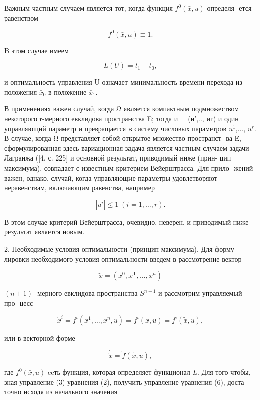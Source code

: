 \documentclass[10pt]{article}
\begin{document}
Важным частным случаем является тот, когда функция \({f}^{0}\left( {\bar{x},u}\right)\) определя- ется равенством

\[
{f}^{0}\left( {\bar{x},u}\right)  \equiv  1. \tag{4}
\]

B этом случае имеем

\[
L\left( U\right)  = {t}_{1} - {t}_{0},
\]

и оптимальность управления U означает минимальность времени перехода из положения \({\bar{x}}_{0}\) в положение \({\bar{x}}_{1}\).

В применениях важен случай, когда Ω является компактным подмножеством некоторого r-мерного евклидова пространства E; тогда и = (и',.., иг) и один управляющий параметр и превращается в систему числовых параметров \({u}^{1}\),..., \({u}^{r}\). В случае, когда Ω представляет собой открытое множество пространст- ва E, сформулированная здесь вариационная задача является частным случаем задачи Лагранжа ([4, с. 225] и основной результат, приводимый ниже (прин- цип максимума), совпадает с известным критерием Вейерштрасса. Для прило- жений важен, однако, случай, когда управляющие параметры удовлетворяют неравенствам, включающим равенства, например

\[
\left| {u}^{i}\right|  \leq  1\;\left( {i = 1,\ldots,r}\right).
\]

В этом случае критерий Вейерштрасса, очевидно, неверен, и приводимый ниже результат является новым.

2. Необходимые условия оптимальности (принцип максимума). Для форму- лировки необходимого условия оптимальности введем в рассмотрение вектор

\[
\widetilde{x} = \left( {{x}^{0},{x}^{\mathrm{T}},\ldots,{x}^{n}}\right)
\]

\(\left( {n + 1}\right)\) -мерного евклидова пространства \({S}^{n + 1}\) и рассмотрим управляемый про- цесс

\[
{\dot{x}}^{i} = {f}^{i}\left( {{x}^{1},\ldots,{x}^{n},u}\right)  = {f}^{i}\left( {\bar{x},u}\right)  = {f}^{i}\left( {\widetilde{x},u}\right), \tag{5}
\]

или в векторной форме

\[
\dot{\widetilde{x}} = \widetilde{f}\left( {\widetilde{x},u}\right), \tag{6}
\]

где \({f}^{0}\left( {\bar{x},u}\right)\) ecть функция, которая определяет функционал \(L\). Для того чтобы, зная управление (3) уравнения (2), получить управление уравнения (6), доста- точно исходя из начального значения
\end{document}
